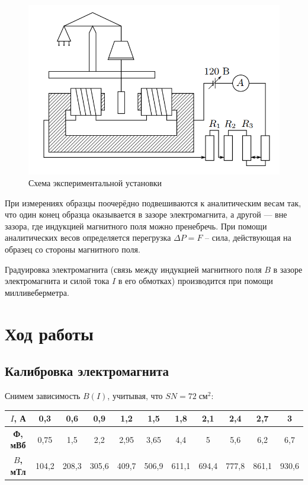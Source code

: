 \begin{figure}[h]
    \centering
    \includegraphics[width = 10 cm]{images/1.png}
    \caption{Схема экспериментальной установки}
    \label{eksp_ust}
\end{figure}

При измерениях образцы поочерёдно подвешиваются к аналитическим весам так, что один конец образца оказывается в зазоре электромагнита, а другой — вне зазора, где индукцией магнитного поля можно пренебречь. При помощи аналитических весов определяется перегрузка $\Delta P = F$ -- сила, действующая на образец со стороны магнитного поля.

Градуировка электромагнита (связь между индукцией магнитного поля $B$ в зазоре электромагнита и силой тока $I$ в его обмотках) производится при помощи милливеберметра.

\section{Ход работы}

\subsection{Калибровка электромагнита}

Снимем зависимость $B(I)$, учитывая, что $SN = 72 \; \text{см}^2$:

\begin{table}[h!]
    \begin{tabular}{|c|c|c|c|c|c|c|c|c|c|c|}
    \hline
    \textbf{$I$, А}   & 0,3   & 0,6   & 0,9   & 1,2   & 1,5   & 1,8   & 2,1   & 2,4   & 2,7   & 3     \\ \hline
    \textbf{Ф, мВб}   & 0,75  & 1,5   & 2,2   & 2,95  & 3,65  & 4,4   & 5     & 5,6   & 6,2   & 6,7   \\ \hline
    \textbf{$B$, мТл} & 104,2 & 208,3 & 305,6 & 409,7 & 506,9 & 611,1 & 694,4 & 777,8 & 861,1 & 930,6 \\ \hline
    \end{tabular}
\end{table}

